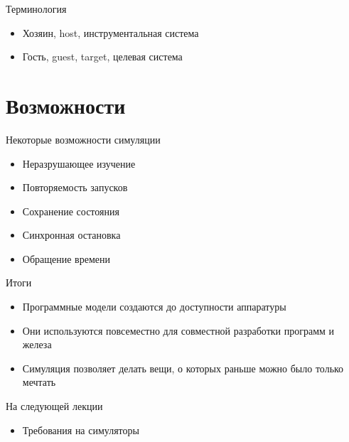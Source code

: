 \begin{frame}{Терминология}
\begin{itemize}
\item Хозяин, host, инструментальная система
\item Гость, guest, target, целевая система
\end{itemize}
\end{frame}

\section{Возможности}

\begin{frame}{Некоторые возможности симуляции}
\begin{itemize}
\item Неразрушающее изучение
\item Повторяемость запусков
\item Сохранение состояния
\item Синхронная остановка
\item Обращение времени
\end{itemize}
\end{frame}

\begin{frame}{Итоги}
\begin{itemize}
\item Программные модели создаются до доступности аппаратуры
\item Они используются повсеместно для совместной разработки программ и железа
\item Симуляция позволяет делать вещи, о которых раньше можно было только мечтать
\end{itemize}
\end{frame}

\begin{frame}{На следующей лекции}
\begin{itemize}
\item Требования на симуляторы
\end{itemize}
\end{frame}


%
%
%


